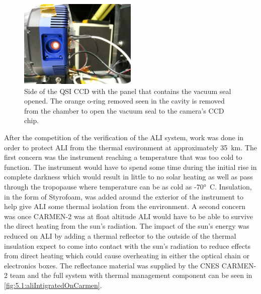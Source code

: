\begin{figure}
    \center
    \includegraphics[trim={0 150 1200 0},clip,width=0.5\textwidth]{./Images/5-1-CCDVacuumUnsealing.jpg}
    \caption[QSI CCD Vacuum Sealing O-ring]{Side of the QSI CCD with the panel that contains the vacuum seal opened. The orange o-ring removed seen in the cavity is removed from the chamber to open the vacuum seal to the camera's CCD chip.}
    \label{fig:5.1:ccdVacuumUnsealing}
\end{figure}

 After the competition of the verification of the ALI system, work was done in order to protect ALI from the thermal environment at approximately 35~km. The first concern was the instrument reaching a temperature that was too cold to function. The instrument would have to spend some time during the initial rise in complete darkness which would result in little to no solar heating as well as pass through the tropopause where temperature can be as cold as -70\si{\degree C}. Insulation, in the form of Styrofoam, was added around the exterior of the instrument to help give ALI some thermal isolation from the environment. A second concern was once CARMEN-2 was at float altitude ALI would have to be able to survive the direct heating from the sun's radiation. The impact of the sun's energy was reduced on ALI by adding a thermal reflector to the outside of the thermal insulation expect to come into contact with the sun's radiation to reduce effects from direct heating which could cause overheating in either the optical chain or electronics boxes. The reflectance material was supplied by the CNES CARMEN-2 team and the full system with thermal management component can be seen in \autoref{fig:5.1:aliIntigratedOnCarmen}.

